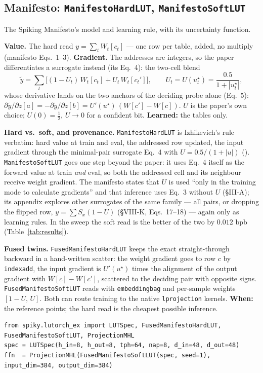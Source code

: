 \documentclass[11pt]{article}
\DeclareRobustCommand{\code}[1]{{\renewcommand{\_}{\textunderscore\allowbreak}\texttt{#1}}}
\begin{document}
\subsection{Manifesto: \code{ManifestoHardLUT}, \code{ManifestoSoftLUT}}
\label{sec:manifesto}
The Spiking Manifesto's model and learning rule, with its uncertainty function.

\textbf{Value.} The hard read $y=\sum_t W_t[c_t]$ --- one row per table, added, no multiply (manifesto
Eqs.~1--3). \textbf{Gradient.} The addresses are integers, so the paper differentiates a surrogate instead
(its Eq.~4): the two-cell blend
\[
  \tilde y=\sum_t\big[(1-U_t)\,W_t[c_t]+U_t\,W_t[c_t']\big],\qquad U_t=U(u^\star_t)=\frac{0.5}{1+|u^\star_t|},
\]
whose derivative lands on the two anchors of the deciding probe alone (Eq.~5):
$\partial\tilde y/\partial z[a]=-\partial\tilde y/\partial z[b]=U'(u^\star)\,(W[c']-W[c])$. $U$ is the paper's own choice; $U(0)=\tfrac12$,
$U\to0$ for a confident bit. \textbf{Learned:} the tables only.

\textbf{Hard vs.\ soft, and provenance.} \code{ManifestoHardLUT} is Izhikevich's rule verbatim: hard value
at train and eval, the addressed row updated, the input gradient through the minimal-pair surrogate Eq.~4
with $U=0.5/(1+|u|)$ (\citealp[\S III-A and Fig.~10]{manifesto}). \code{ManifestoSoftLUT} goes one step
beyond the paper: it uses Eq.~4 itself as the forward value at train \emph{and} eval, so both the addressed
cell and its neighbour receive weight gradient. The manifesto states that $U$ is used ``only in the training
mode to calculate gradients'' and that inference uses Eq.~3 without $U$ (\S III-A); its appendix explores
other surrogates of the same family --- all pairs, or dropping the flipped row, $y=\sum S_x(1-U)$
(\S VIII-K, Eqs.~17--18) --- again only as learning rules. In the sweep the soft read is the better of the
two by $0.012$ bpb (Table~\ref{tab:results}).

\textbf{Fused twins.} \code{FusedManifestoHardLUT} keeps the exact straight-through backward in a
hand-written scatter: the weight gradient goes to row $c$ by \code{index\_add}, the input gradient is
$U'(u^\star)$ times the alignment of the output gradient with $W[c]-W[c']$, scattered to the deciding pair
with opposite signs. \code{FusedManifestoSoftLUT} reads with \code{embedding\_bag} and per-sample weights
$[1-U,\,U]$. Both can route training to the native \code{lprojection} kernels. \textbf{When:} the
reference points; the hard read is the cheapest possible inference.
\begin{lstlisting}
from spiky.lutorch_ex import LUTSpec, FusedManifestoHardLUT, FusedManifestoSoftLUT, ProjectionMHL
spec = LUTSpec(h_in=8, h_out=8, tph=64, nap=8, d_in=48, d_out=48)
ffn  = ProjectionMHL(FusedManifestoSoftLUT(spec, seed=1), input_dim=384, output_dim=384)
\end{lstlisting}
\end{document}

